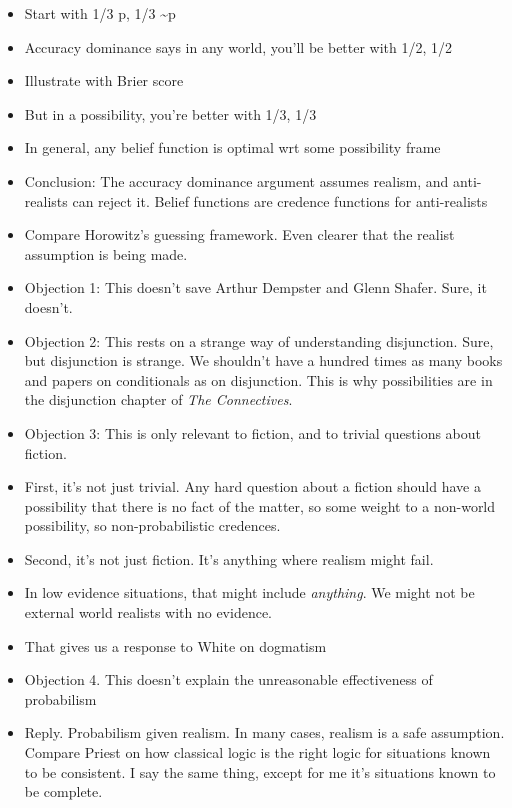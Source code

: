 \documentclass[
  11pt,
  letterpaper,
  DIV=11,
  numbers=noendperiod,
  twoside]{scrartcl}
\providecommand{\tightlist}{%
  \setlength{\itemsep}{0pt}\setlength{\parskip}{0pt}}
\begin{document}
\begin{itemize}
\tightlist
\item
  Start with 1/3 p, 1/3 \textasciitilde p
\item
  Accuracy dominance says in any world, you'll be better with 1/2, 1/2
\item
  Illustrate with Brier score
\item
  But in a possibility, you're better with 1/3, 1/3
\item
  In general, any belief function is optimal wrt some possibility frame
\item
  Conclusion: The accuracy dominance argument assumes realism, and
  anti-realists can reject it. Belief functions are credence functions
  for anti-realists
\item
  Compare Horowitz's guessing framework. Even clearer that the realist
  assumption is being made.
\item
  Objection 1: This doesn't save Arthur Dempster and Glenn Shafer. Sure,
  it doesn't.
\item
  Objection 2: This rests on a strange way of understanding disjunction.
  Sure, but disjunction is strange. We shouldn't have a hundred times as
  many books and papers on conditionals as on disjunction. This is why
  possibilities are in the disjunction chapter of \emph{The
  Connectives}.
\item
  Objection 3: This is only relevant to fiction, and to trivial
  questions about fiction.
\item
  First, it's not just trivial. Any hard question about a fiction should
  have a possibility that there is no fact of the matter, so some weight
  to a non-world possibility, so non-probabilistic credences.
\item
  Second, it's not just fiction. It's anything where realism might fail.
\item
  In low evidence situations, that might include \emph{anything}. We
  might not be external world realists with no evidence.
\item
  That gives us a response to White on dogmatism
\item
  Objection 4. This doesn't explain the unreasonable effectiveness of
  probabilism
\item
  Reply. Probabilism given realism. In many cases, realism is a safe
  assumption. Compare Priest on how classical logic is the right logic
  for situations known to be consistent. I say the same thing, except
  for me it's situations known to be complete.
\end{itemize}
\end{document}
